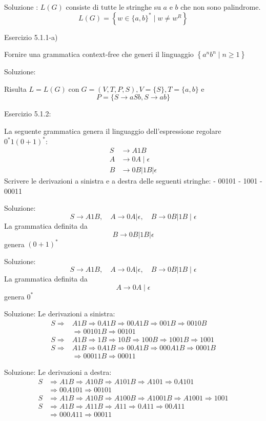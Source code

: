 Soluzione :
$L(G)$ consiste di tutte le stringhe su $a$ e $b$ che non sono palindrome.
$$
L(G)=\left\{w \in\{a, b\}^{*} \mid w \neq w^{R}\right\}
$$

Esercizio 5.1.1-a)

Fornire una grammatica context-free che generi il linguaggio $\left\{a^{n} b^{n} \mid n \geq 1\right\}$

Soluzione:

Risulta $L=L(G) \operatorname{con} G=(V, T, P, S), V=\{S\}, T=\{a, b\}$ e
$$
P=\{S \rightarrow a S b, S \rightarrow a b\}
$$

Esercizio 5.1.2:

La seguente grammatica genera il linguaggio dell'espressione regolare $0^{*} 1(0+1)^{*}:$
$$
\begin{aligned}
S & \rightarrow A 1 B \\
A & \rightarrow 0 A \mid \epsilon \\
B & \rightarrow 0 B|1 B| \epsilon
\end{aligned}
$$
Scrivere le derivazioni a sinistra e a destra delle seguenti stringhe:
- 00101
- 1001
- 00011


Soluzione:
$$
S \rightarrow A 1 B, \quad A \rightarrow 0 A|\epsilon, \quad B \rightarrow 0 B| 1 B \mid \epsilon
$$
La grammatica definita da
$$
B \rightarrow 0 B|1 B| \epsilon
$$
genera $(0+1)^{*}$

Soluzione:
$$
S \rightarrow A 1 B, \quad A \rightarrow 0 A|\epsilon, \quad B \rightarrow 0 B| 1 B \mid \epsilon
$$
La grammatica definita da
$$
A \rightarrow 0 A \mid \epsilon
$$
genera $0^{*}$

Soluzione:
Le derivazioni a sinistra:
$$
\begin{aligned}
S \Rightarrow & A 1 B \Rightarrow 0 A 1 B \Rightarrow 00 A 1 B \Rightarrow 001 B \Rightarrow 0010 B \\
& \Rightarrow 00101 B \Rightarrow 00101 \\
S \Rightarrow & A 1 B \Rightarrow 1 B \Rightarrow 10 B \Rightarrow 100 B \Rightarrow 1001 B \Rightarrow 1001 \\
S \Rightarrow & A 1 B \Rightarrow 0 A 1 B \Rightarrow 00 A 1 B \Rightarrow 000 A 1 B \Rightarrow 0001 B \\
& \Rightarrow 00011 B \Rightarrow 00011
\end{aligned}
$$

Soluzione:
Le derivazioni a destra:
$$
\begin{aligned}
S & \Rightarrow A 1 B \Rightarrow A 10 B \Rightarrow A 101 B \Rightarrow A 101 \Rightarrow 0 A 101 \\
& \Rightarrow 00 A 101 \Rightarrow 00101 \\
S & \Rightarrow A 1 B \Rightarrow A 10 B \Rightarrow A 100 B \Rightarrow A 1001 B \Rightarrow A 1001 \Rightarrow 1001 \\
S & \Rightarrow A 1 B \Rightarrow A 11 B \Rightarrow A 11 \Rightarrow 0 A 11 \Rightarrow 00 A 11 \\
& \Rightarrow 000 A 11 \Rightarrow 00011
\end{aligned}
$$

